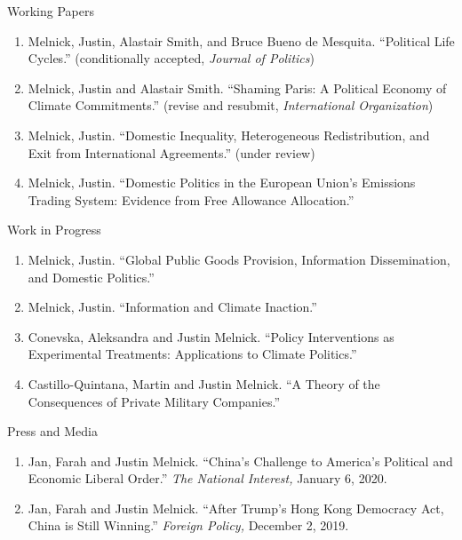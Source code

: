 \documentclass{resume} %
\begin{document}
\begin{rSection}{Working Papers}

\begin{enumerate}

    \item Melnick, Justin, Alastair Smith, and Bruce Bueno de Mesquita. ``Political Life Cycles.'' (conditionally accepted, \textit{Journal of Politics})
        \item Melnick, Justin and Alastair Smith. ``Shaming Paris: A Political Economy of Climate Commitments.'' (revise and resubmit, \textit{International Organization})
            \item Melnick, Justin. ``Domestic Inequality, Heterogeneous Redistribution, and Exit from International Agreements.'' (under review)
        \item Melnick, Justin. ``Domestic Politics in the European Union’s Emissions Trading System: Evidence from Free Allowance Allocation.''
\end{enumerate}

\end{rSection}

\begin{rSection}{Work in Progress}

\begin{enumerate}
    \item Melnick, Justin. ``Global Public Goods Provision, Information Dissemination, and Domestic Politics.'' 
    \item Melnick, Justin. ``Information and Climate Inaction.''
    \item Conevska, Aleksandra and Justin Melnick. ``Policy Interventions as Experimental Treatments: Applications to Climate Politics.''
    \item Castillo-Quintana, Martin and Justin Melnick. ``A Theory of the Consequences of Private Military Companies.''
\end{enumerate}

\end{rSection}

\begin{rSection}{Press and Media}
    \begin{enumerate}
    \item   Jan, Farah and Justin Melnick. ``China's Challenge to America's Political and Economic Liberal Order.'' \textit{The National Interest,} January 6, 2020.
    \item    Jan, Farah and Justin Melnick. ``After Trump's Hong Kong Democracy Act, China is Still Winning.'' \textit{Foreign Policy,} December 2, 2019.
\end{enumerate}
\end{rSection}
\end{document}
